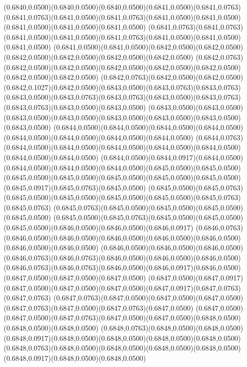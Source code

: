 (0.6840,0.0500)(0.6840,0.0500)(0.6840,0.0500)(0.6841,0.0500)(0.6841,0.0763)
\PST@Solid(0.6841,0.0763)(0.6841,0.0500)(0.6841,0.0763)(0.6841,0.0500)(0.6841,0.0500)(0.6841,0.0500)(0.6841,0.0500)(0.6841,0.0500)
(0.6841,0.0763)(0.6841,0.0763)(0.6841,0.0500)(0.6841,0.0500)(0.6841,0.0763)(0.6841,0.0500)(0.6841,0.0500)(0.6841,0.0500)
(0.6841,0.0500)(0.6841,0.0500)(0.6842,0.0500)(0.6842,0.0500)(0.6842,0.0500)(0.6842,0.0500)(0.6842,0.0500)(0.6842,0.0500)
(0.6842,0.0763)(0.6842,0.0500)(0.6842,0.0500)(0.6842,0.0500)(0.6842,0.0500)(0.6842,0.0500)(0.6842,0.0500)(0.6842,0.0500)
(0.6842,0.0763)(0.6842,0.0500)(0.6842,0.0500)(0.6842,0.1027)(0.6842,0.0500)(0.6843,0.0500)(0.6843,0.0763)(0.6843,0.0763)
(0.6843,0.0500)(0.6843,0.0763)(0.6843,0.0763)(0.6843,0.0500)(0.6843,0.0763)(0.6843,0.0763)(0.6843,0.0500)(0.6843,0.0500)
(0.6843,0.0500)(0.6843,0.0500)(0.6843,0.0500)(0.6843,0.0500)(0.6843,0.0500)(0.6843,0.0500)(0.6843,0.0500)(0.6843,0.0500)
(0.6844,0.0500)(0.6844,0.0500)(0.6844,0.0500)(0.6844,0.0500)(0.6844,0.0500)(0.6844,0.0500)(0.6844,0.0500)(0.6844,0.0500)
(0.6844,0.0763)(0.6844,0.0500)(0.6844,0.0500)(0.6844,0.0500)(0.6844,0.0500)(0.6844,0.0500)(0.6844,0.0500)(0.6844,0.0500)
(0.6844,0.0500)(0.6844,0.0917)(0.6844,0.0500)(0.6844,0.0500)(0.6844,0.0500)(0.6844,0.0500)(0.6845,0.0500)(0.6845,0.0500)
(0.6845,0.0500)(0.6845,0.0500)(0.6845,0.0500)(0.6845,0.0500)(0.6845,0.0500)(0.6845,0.0917)(0.6845,0.0763)(0.6845,0.0500)
(0.6845,0.0500)(0.6845,0.0763)(0.6845,0.0500)(0.6845,0.0500)(0.6845,0.0500)(0.6845,0.0500)(0.6845,0.0763)(0.6845,0.0763)
(0.6845,0.0763)(0.6845,0.0500)(0.6845,0.0500)(0.6845,0.0500)(0.6845,0.0500)
\PST@Solid(0.6845,0.0500)(0.6845,0.0763)(0.6845,0.0500)(0.6845,0.0500)(0.6845,0.0500)(0.6846,0.0500)(0.6846,0.0500)(0.6846,0.0917)
(0.6846,0.0763)(0.6846,0.0500)(0.6846,0.0500)(0.6846,0.0500)(0.6846,0.0500)(0.6846,0.0500)(0.6846,0.0500)(0.6846,0.0500)
(0.6846,0.0500)(0.6846,0.0500)(0.6846,0.0500)(0.6846,0.0763)(0.6846,0.0763)(0.6846,0.0500)(0.6846,0.0500)(0.6846,0.0500)
(0.6846,0.0763)(0.6846,0.0763)(0.6846,0.0500)(0.6846,0.0917)(0.6846,0.0500)(0.6847,0.0500)(0.6847,0.0500)(0.6847,0.0500)
(0.6847,0.0500)(0.6847,0.0917)(0.6847,0.0500)(0.6847,0.0500)(0.6847,0.0500)(0.6847,0.0917)(0.6847,0.0763)(0.6847,0.0763)
(0.6847,0.0763)(0.6847,0.0500)(0.6847,0.0500)(0.6847,0.0500)(0.6847,0.0763)(0.6847,0.0500)(0.6847,0.0763)(0.6847,0.0500)
(0.6847,0.0500)(0.6847,0.0500)(0.6847,0.0763)(0.6847,0.0500)(0.6847,0.0500)(0.6848,0.0500)(0.6848,0.0500)(0.6848,0.0500)
(0.6848,0.0763)(0.6848,0.0500)(0.6848,0.0500)(0.6848,0.0917)(0.6848,0.0500)(0.6848,0.0500)(0.6848,0.0500)(0.6848,0.0500)
(0.6848,0.0763)(0.6848,0.0500)(0.6848,0.0500)(0.6848,0.0500)(0.6848,0.0500)(0.6848,0.0917)(0.6848,0.0500)(0.6848,0.0500)
